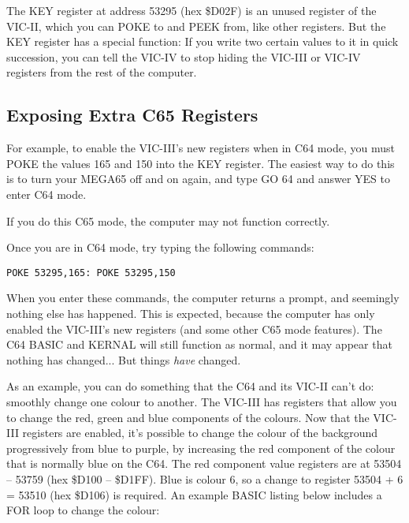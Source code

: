 
The KEY register at address 53295 (hex \$D02F) is an unused register of the VIC-II, which you can POKE to and
PEEK from, like other registers.  But the KEY register has a special function: If
you write two certain values to it in quick succession, you can tell the VIC-IV
to stop hiding the VIC-III or VIC-IV registers from the rest of the computer.

\subsection{Exposing Extra C65 Registers}

For example, to enable the VIC-III's new registers when in C64 mode, you must POKE the values 165 and 150
into the KEY register. The easiest way to do this is to turn your MEGA65 off and on again, and type GO 64
and answer YES to enter C64 mode.

If you do this C65 mode, the computer may not function correctly.

Once you are in C64 mode, try typing the following commands:

\begin{tcolorbox}[colback=black,coltext=white]
\verbatimfont{\codefont}
\begin{verbatim}
POKE 53295,165: POKE 53295,150
\end{verbatim}
\end{tcolorbox}

When you enter these commands, the computer returns a  prompt, and seemingly nothing else has
happened.  This is expected, because the computer has only enabled the VIC-III's new registers (and some other
C65 mode features). The C64 BASIC and KERNAL will still function as normal, and it may appear
that nothing has changed... But things \textit{have} changed.

As an example, you can do something that the C64 and its VIC-II can't do: smoothly change one colour to another.
The VIC-III has registers that allow you to change the red, green and blue components of the colours. Now that the VIC-III
registers are enabled, it's possible to change the colour of the background progressively from blue to purple, by increasing
the red component of the colour that is normally blue on the C64.  The red component value registers are at
53504 -- 53759 (hex \$D100 -- \$D1FF). Blue is colour 6, so a change to register 53504 + 6 = 53510 (hex \$D106) is required.
An example BASIC listing below includes a FOR loop to change the colour:

